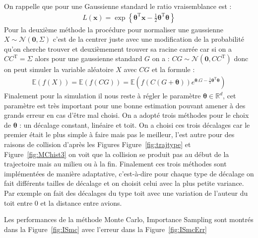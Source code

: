 \documentclass[a4paper, 12pt,twoside]{article}
\numberwithin{equation}{subsection}
\begin{document}
	On rappelle que pour une Gaussienne standard le ratio vraisemblance est :
	\begin{align}
		L(\boldsymbol x) = \exp\left \{
		\boldsymbol\theta^\mathrm{T} {\mathbf x}
		-\frac{1}{2} \boldsymbol\theta^\mathrm{T} \boldsymbol\theta
		\right \}
	\end{align}
	Pour la deuxième méthode la procédure pour normaliser une gaussienne $X \sim \mathcal{N}(\boldsymbol 0, \Sigma)$ c'est de la centrer juste avec une modification de la probabilité qu'on cherche trouver et deuxièmement trouver sa racine carrée car si on a $CC^{\mathrm{T}}=\Sigma$ alors pour une gaussienne standard $G$ on a : $CG \sim \mathcal{N} (\boldsymbol 0, C C^{\mathrm{T}})$ donc on peut simuler la variable aléatoire $X$ avec $CG$ et la formule :
	\begin{align}
		\mathbb{E}(f(X)) = \mathbb{E}(f(CG)) = 
		\mathbb{E}(
		f(C(G+{\boldsymbol \theta}))
		e^{{\boldsymbol \theta}.G
		 -\frac{1}{2} \boldsymbol\theta^\mathrm{T} \boldsymbol\theta})
	\end{align}
	Finalement pour la simulation il nous reste à régler le paramètre $\boldsymbol \theta \in \mathbb{R}^{d}$, cet paramètre est très important pour une bonne estimation pouvant amener à des grands erreur en cas d'être mal choisi. On a adopté trois méthodes pour le choix de $\boldsymbol \theta$ : un décalage constant, linéaire et toit. On a choisi ces trois décalages car le premier était le plus simple à faire mais pas le meilleur, l'est autre pour des raisons de collision d'après les Figures Figure~\ref{fig:trajtype} et Figure~\ref{fig:MChist3} on voit que la collision se produit pas au début de la trajectoire mais au milieu ou à la fin. Finalement ces trois méthodes sont implémentées de manière adaptative, c'est-à-dire pour chaque type de décalage on fait différents tailles de décalage et on choisit celui avec la plus petite variance. Par exemple on fait des décalages du type toit avec une variation de l'auteur du toit entre 0 et la distance entre avions.
	
	Les performances de la méthode Monte Carlo, Importance Sampling sont montrés dans la Figure~\ref{fig:ISmc} avec l'erreur dans la Figure~\ref{fig:ISmcErr}
	
\end{document}
